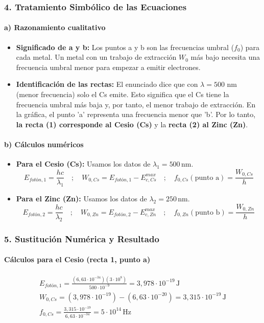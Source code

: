 \subsubsection*{4. Tratamiento Simbólico de las Ecuaciones}
\paragraph*{a) Razonamiento cualitativo}
\begin{itemize}
    \item \textbf{Significado de a y b:} Los puntos a y b son las frecuencias umbral ($f_0$) para cada metal. Un metal con un trabajo de extracción $W_0$ más bajo necesita una frecuencia umbral menor para empezar a emitir electrones.
    \item \textbf{Identificación de las rectas:} El enunciado dice que con $\lambda=500$ nm (menor frecuencia) solo el Cs emite. Esto significa que el Cs tiene la frecuencia umbral más baja y, por tanto, el menor trabajo de extracción. En la gráfica, el punto 'a' representa una frecuencia menor que 'b'. Por lo tanto, \textbf{la recta (1) corresponde al Cesio (Cs)} y la \textbf{recta (2) al Zinc (Zn)}.
\end{itemize}
\paragraph*{b) Cálculos numéricos}
\begin{itemize}
    \item \textbf{Para el Cesio (Cs):} Usamos los datos de $\lambda_1 = 500\,\text{nm}$.
    $$ E_{fotón,1} = \frac{hc}{\lambda_1} \quad ; \quad W_{0,Cs} = E_{fotón,1} - E_{c, Cs}^{max} \quad ; \quad f_{0,Cs} (\text{punto a}) = \frac{W_{0,Cs}}{h} $$
    \item \textbf{Para el Zinc (Zn):} Usamos los datos de $\lambda_2 = 250\,\text{nm}$.
    $$ E_{fotón,2} = \frac{hc}{\lambda_2} \quad ; \quad W_{0,Zn} = E_{fotón,2} - E_{c, Zn}^{max} \quad ; \quad f_{0,Zn} (\text{punto b}) = \frac{W_{0,Zn}}{h} $$
\end{itemize}

\subsubsection*{5. Sustitución Numérica y Resultado}
\paragraph*{Cálculos para el Cesio (recta 1, punto a)}
\begin{gather}
    E_{fotón,1} = \frac{(6,63\cdot10^{-34})(3\cdot10^8)}{500\cdot10^{-9}} = 3,978\cdot10^{-19}\,\text{J} \\
    W_{0,Cs} = (3,978\cdot10^{-19}) - (6,63\cdot10^{-20}) = 3,315\cdot10^{-19}\,\text{J} \\
    f_{0,Cs} = \frac{3,315\cdot10^{-19}}{6,63\cdot10^{-34}} = 5\cdot10^{14}\,\text{Hz}
\end{gather}
